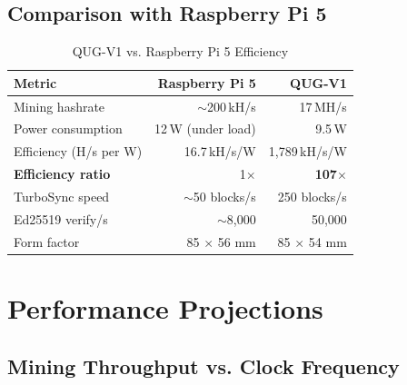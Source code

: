 \documentclass[11pt,a4paper]{article}
\begin{document}
\subsection{Comparison with Raspberry Pi 5}

\begin{table}[H]
\centering
\caption{QUG-V1 vs. Raspberry Pi 5 Efficiency}
\begin{tabular}{@{}lrr@{}}
\toprule
\textbf{Metric} & \textbf{Raspberry Pi 5} & \textbf{QUG-V1} \\
\midrule
Mining hashrate & $\sim$200\,kH/s & 17\,MH/s \\
Power consumption & 12\,W (under load) & 9.5\,W \\
Efficiency (H/s per W) & 16.7\,kH/s/W & 1,789\,kH/s/W \\
\textbf{Efficiency ratio} & 1$\times$ & \textbf{107$\times$} \\
\midrule
TurboSync speed & $\sim$50 blocks/s & 250 blocks/s \\
Ed25519 verify/s & $\sim$8,000 & 50,000 \\
Form factor & 85 $\times$ 56 mm & 85 $\times$ 54 mm \\
\bottomrule
\end{tabular}
\end{table}

\section{Performance Projections}
\label{sec:performance}

\subsection{Mining Throughput vs. Clock Frequency}
\end{document}
